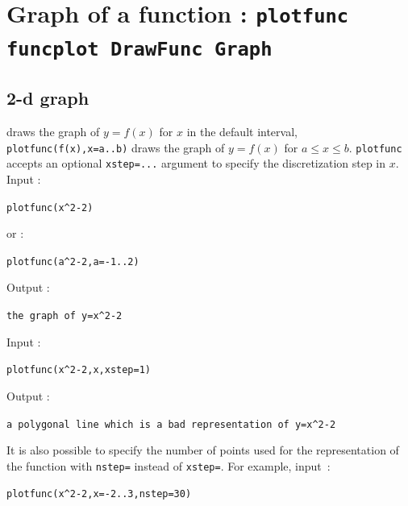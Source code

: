 \documentclass[a4paper,11pt]{book}
\begin{document}
\section{Graph of a function : {\tt plotfunc funcplot DrawFunc Graph}}

\subsection{2-d graph}\label{sec:plotfunc}
 draws the graph of $y=f(x)$ for $x$ in
the default interval, 
{\tt plotfunc(f(x),x=a..b)} draws the graph of $y=f(x)$ for $a\leq x\leq b$.
{\tt plotfunc} accepts an optional \verb|xstep=...| argument to 
specify the discretization step in $x$.\\
Input :
\begin{center}{\tt  plotfunc(x\verb|^|2-2)}\end{center}
or :
\begin{center}{\tt  plotfunc(a\verb|^|2-2,a=-1..2)}\end{center}
Output :
\begin{center}{\tt the graph of y=x\verb|^|2-2}\end{center}
Input :
\begin{center}{\tt  plotfunc(x\verb|^|2-2,x,xstep=1)}\end{center}
Output :
\begin{center}{\tt a polygonal line which is a bad representation of y=x\verb|^|2-2 }\end{center}
It is also possible to specify the number of points used for the 
representation of the function with \verb|nstep=| instead of \verb|xstep=|.
For example, input~:
\begin{center}{\tt  plotfunc(x\verb|^|2-2,x=-2..3,nstep=30)}\end{center}
\end{document}
